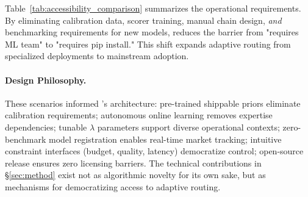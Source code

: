 Table~\ref{tab:accessibility_comparison} summarizes the operational requirements. By eliminating calibration data, scorer training, manual chain design, \emph{and} benchmarking requirements for new models, \ours{} reduces the barrier from "requires ML team" to "requires pip install." This shift expands adaptive routing from specialized deployments to mainstream adoption.

\paragraph{Design Philosophy.} These scenarios informed \ours{}'s architecture: pre-trained shippable priors eliminate calibration requirements; autonomous online learning removes expertise dependencies; tunable $\lambda$ parameters support diverse operational contexts; zero-benchmark model registration enables real-time market tracking; intuitive constraint interfaces (budget, quality, latency) democratize control; open-source release ensures zero licensing barriers. The technical contributions in \S\ref{sec:method} exist not as algorithmic novelty for its own sake, but as mechanisms for democratizing access to adaptive routing.


